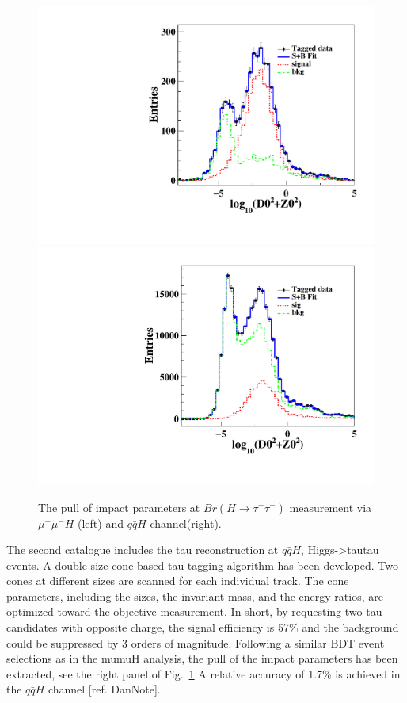 \begin{figure}[h!]
\centering
\includegraphics[scale=0.30]{Figures/Performance/dan/newe2e2H.pdf}
\includegraphics[scale=0.30]{Figures/Performance/dan/newqqH.pdf}
\caption{The pull of impact parameters at $Br(H \to \tau^+\tau^-)$ measurement via $\mu^+\mu^-H$ (left) and $q\bar{q}H$ channel(right). }
\label{fig:tautau}
\end{figure}


The second catalogue includes the tau reconstruction at $q\bar{q}H$, Higgs->tautau events.
A double size cone-based tau tagging algorithm has been developed.
Two cones at different sizes are scanned for each individual track.
The cone parameters, including the sizes, the invariant mass, and the energy ratios,
are optimized toward the objective measurement.
In short, by requesting two tau candidates with opposite charge,
the signal efficiency is 57\% and the background could be suppressed by 3 orders of magnitude.
Following a similar BDT event selections as in the mumuH analysis, the pull of the impact parameters has been extracted,
see the right panel of Fig.~\ref{fig:tautau} A relative accuracy of 1.7\% is achieved in the $q\bar{q}H$ channel [ref. DanNote]. 

